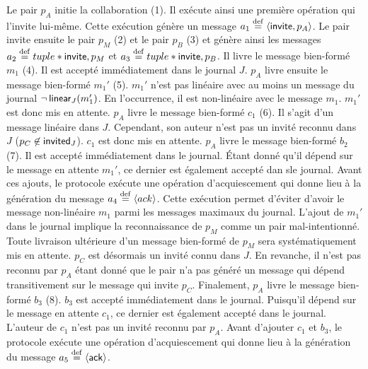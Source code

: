Le pair $p_A$ initie la collaboration (1).
Il exécute ainsi une première opération qui l'invite lui-même.
Cette exécution génère un message $a_1 \defeq \tuple*{\trm{invite}, p_A}$.
Le pair invite ensuite le pair $p_M$ (2) et le pair $p_B$ (3) et génère ainsi les messages $a_2 \defeq tuple*{\trm{invite}, p_M}$ et $a_3 \defeq tuple*{\trm{invite}, p_B}$.
Il livre le message bien-formé $m_1$ (4).
Il est accepté immédiatement dans le journal $J$.
$p_A$ livre ensuite le message bien-formé $m_1'$ (5).
$m_1'$ n'est pas linéaire avec au moins un message du journal $\neg \trm{linear}_J(m_1')$.
En l'occurrence, il est non-linéaire avec le message $m_1$.
$m_1'$ est donc mis en attente.
$p_A$ livre le message bien-formé $c_1$ (6).
Il s'agit d'un message linéaire dans $J$.
Cependant, son auteur n'est pas un invité reconnu dans $J$ ($p_C \not\in \trm{invited}_J$).
$c_1$ est donc mis en attente.
$p_A$ livre le message bien-formé $b_2$ (7).
Il est accepté immédiatement dans le journal.
Étant donné qu'il dépend sur le message en attente $m_1'$, ce dernier est également accepté dan sle journal.
Avant ces ajouts, le protocole exécute une opération d'acquiescement qui donne lieu à la génération du message $a_4 \defeq \tuple*{ack}$.
Cette exécution permet d'éviter d'avoir le message non-linéaire $m_1$ parmi les messages maximaux du journal.
L'ajout de $m_1'$ dans le journal implique la reconnaissance de $p_M$ comme un pair mal-intentionné.
Toute livraison ultérieure d'un message bien-formé de $p_M$ sera systématiquement mis en attente.
$p_C$ est désormais un invité connu dans $J$.
En revanche, il n'est pas reconnu par $p_A$ étant donné que le pair n'a pas généré un message qui dépend transitivement sur le message qui invite $p_C$.
Finalement, $p_A$ livre le message bien-formé $b_3$ (8).
$b_3$ est accepté immédiatement dans le journal.
Puisqu'il dépend sur le message en attente $c_1$, ce dernier est également accepté dans le journal.
L'auteur de $c_1$ n'est pas un invité reconnu par $p_A$.
Avant d'ajouter $c_1$ et $b_3$, le protocole exécute une opération d'acquiescement qui donne lieu à la génération du message $a_5 \defeq \tuple*{\trm{ack}}$.

